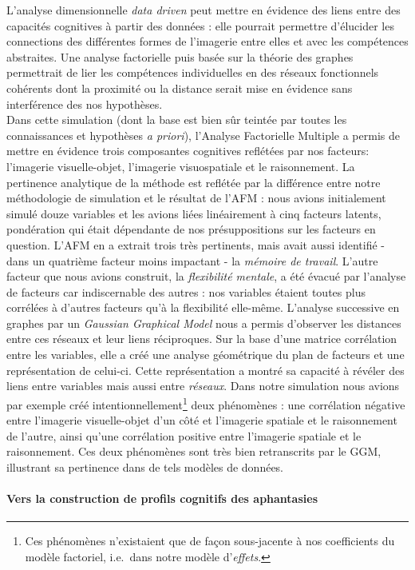 \documentclass[
  12pt,
]{article}
\let\oldparagraph\paragraph
\renewcommand{\paragraph}[1]{\oldparagraph{#1}\mbox{}}
\begin{document}
L'analyse dimensionnelle \emph{data driven} peut mettre en évidence des
liens entre des capacités cognitives à partir des données : elle
pourrait permettre d'élucider les connections des différentes formes de
l'imagerie entre elles et avec les compétences abstraites. Une analyse
factorielle puis basée sur la théorie des graphes permettrait de lier
les compétences individuelles en des réseaux fonctionnels cohérents dont
la proximité ou la distance serait mise en évidence sans interférence
des nos hypothèses.\\
Dans cette simulation (dont la base est bien sûr teintée par toutes les
connaissances et hypothèses \emph{a priori}), l'Analyse Factorielle
Multiple a permis de mettre en évidence trois composantes cognitives
reflétées par nos facteurs: l'imagerie visuelle-objet, l'imagerie
visuospatiale et le raisonnement. La pertinence analytique de la méthode
est reflétée par la différence entre notre méthodologie de simulation et
le résultat de l'AFM : nous avions initialement simulé douze variables
et les avions liées linéairement à cinq facteurs latents, pondération
qui était dépendante de nos présuppositions sur les facteurs en
question. L'AFM en a extrait trois très pertinents, mais avait aussi
identifié - dans un quatrième facteur moins impactant - la \emph{mémoire
de travail}. L'autre facteur que nous avions construit, la
\emph{flexibilité mentale}, a été évacué par l'analyse de facteurs car
indiscernable des autres : nos variables étaient toutes plus corrélées à
d'autres facteurs qu'à la flexibilité elle-même. L'analyse successive en
graphes par un \emph{Gaussian Graphical Model} nous a permis d'observer
les distances entre ces réseaux et leur liens réciproques. Sur la base
d'une matrice corrélation entre les variables, elle a créé une analyse
géométrique du plan de facteurs et une représentation de celui-ci. Cette
représentation a montré sa capacité à révéler des liens entre variables
mais aussi entre \emph{réseaux}. Dans notre simulation nous avions par
exemple créé intentionnellement\footnote{Ces phénomènes n'existaient que
  de façon sous-jacente à nos coefficients du modèle factoriel,
  i.e.~dans notre modèle d'\emph{effets}.} deux phénomènes : une
corrélation négative entre l'imagerie visuelle-objet d'un côté et
l'imagerie spatiale et le raisonnement de l'autre, ainsi qu'une
corrélation positive entre l'imagerie spatiale et le raisonnement. Ces
deux phénomènes sont très bien retranscrits par le GGM, illustrant sa
pertinence dans de tels modèles de données.

\hypertarget{vers-la-construction-de-profils-cognitifs-des-aphantasies}{%
\paragraph{Vers la construction de profils cognitifs des
aphantasies}\label{vers-la-construction-de-profils-cognitifs-des-aphantasies}}
\end{document}
